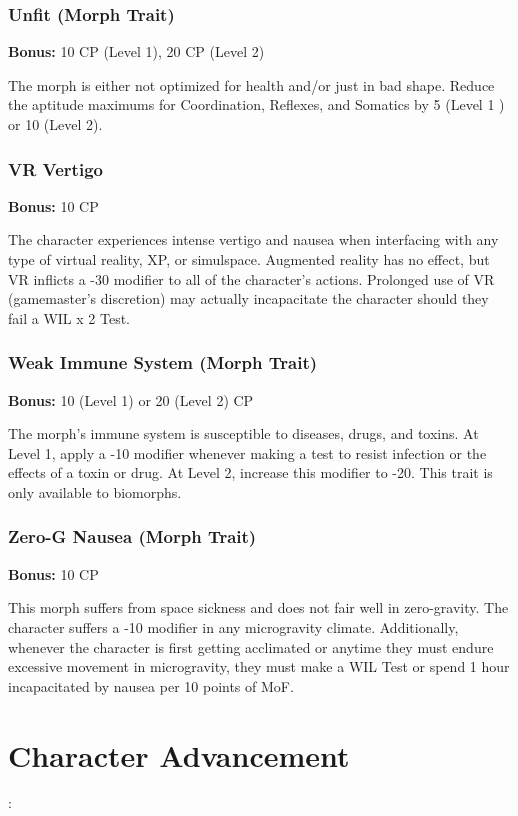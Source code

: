 \subsubsection{Unfit (Morph Trait)}
\textbf{Bonus:} 10 CP (Level 1), 20 CP (Level 2)

The morph is either not optimized for health and/or just in bad shape. Reduce
the aptitude maximums for Coordination, Reflexes, and Somatics by 5 (Level 1 )
or 10 (Level 2).

\subsubsection{VR Vertigo}
\textbf{Bonus:} 10 CP

The character experiences intense vertigo and nausea when interfacing with any
type of virtual reality, XP, or simulspace. Augmented reality has no effect,
but VR inflicts a -30 modifier to all of the character’s actions. Prolonged use
of VR (gamemaster’s discretion) may actually incapacitate the character
should they fail a WIL x 2 Test.

\subsubsection{Weak Immune System (Morph Trait)}
\textbf{Bonus:} 10 (Level 1) or 20 (Level 2) CP

The morph’s immune system is susceptible to diseases, drugs, and toxins. At
Level 1, apply a -10 modifier whenever making a test to resist infection or the
effects of a toxin or drug. At Level 2, increase this modifier to -20. This
trait is only available to biomorphs.

\subsubsection{Zero-G Nausea (Morph Trait)}
\textbf{Bonus:} 10 CP

This morph suffers from space sickness and does not fair well in
zero-gravity. The character suffers a -10 modifier in any microgravity
climate. Additionally, whenever the character is first getting acclimated or
anytime they must endure excessive movement in microgravity, they must make a
WIL Test or spend 1 hour incapacitated by nausea per 10 points of MoF.

\section{Character Advancement}:

